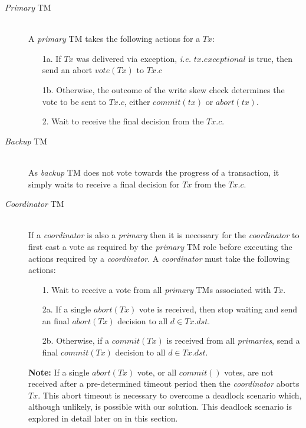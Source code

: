     \begin{description}
        \item[\emph{Primary} TM] \hfill \\
        A \emph{primary} TM takes the following actions for a $Tx$:
            \begin{enumerate}
                \item[1a.]    If $Tx$ was delivered via exception, \emph{i.e.} $tx.exceptional$ is true, then send an abort $vote(Tx)$ to $Tx.c$
                
                \item[1b.]    Otherwise, the outcome of the write skew check determines the vote to be sent to $Tx.c$, either $commit(tx)$ or $abort(tx)$.  
                
                \item[2.]    Wait to receive the final decision from the $Tx.c$.  
            \end{enumerate}
            
        \item[\emph{Backup} TM] \hfill \\
         As \emph{backup} TM does not vote towards the progress of a transaction, it simply waits to receive a final decision for $Tx$ from the $Tx.c$.  
        
        \item[\emph{Coordinator} TM] \hfill \\
        If a \emph{coordinator} is also a \emph{primary} then it is necessary for the \emph{coordinator} to first cast a vote as required by the \emph{primary} TM role before executing the actions required by a \emph{coordinator}.  A \emph{coordinator} must take the following actions:
        
        \begin{enumerate}
            \item[1.]    Wait to receive a vote from all \emph{primary} TMs associated with $Tx$.  
            
            \item[2a.]    If a single $abort(Tx)$ vote is received, then stop waiting and send an final $abort(Tx)$ decision to all $d \in Tx.dst$.  
            
            \item[2b.]    Otherwise, if a $commit(Tx)$ is received from all \emph{primaries}, send a final $commit(Tx)$ decision to all $d \in Tx.dst$.  
        \end{enumerate}
        
        \textbf{Note:} If a single $abort(Tx)$ vote, or all $commit()$ votes, are not received after a pre-determined timeout period then the \emph{coordinator} aborts $Tx$.  This abort timeout is necessary to overcome a deadlock scenario which, although unlikely, is possible with our solution.  This deadlock scenario is explored in detail later on in this section.  
    \end{description}              
    
